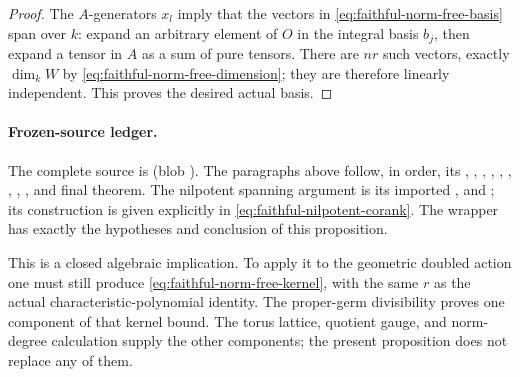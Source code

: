 \begin{proof}
The \(A\)-generators \(x_l\) imply that the vectors in
\eqref{eq:faithful-norm-free-basis} span over \(k\):
expand an arbitrary element of \(O\) in the integral basis
\(b_j\), then expand a tensor in \(A\) as a sum of pure tensors.
There are \(nr\) such vectors, exactly \(\dim_k W\) by
\eqref{eq:faithful-norm-free-dimension}; they are therefore
linearly independent.  This proves the desired actual basis.
\end{proof}

\paragraph{Frozen-source ledger.}
The complete source is
\href{https://github.com/ChristianKudeba/alpoge-rh-verification/blob/alpoge-source-7cbf7a0c/src/Development/WeilBound/CoreStatements/TorusUniformisation/ChowMahlerFamilies/KernelRankAlgebraicBound.lean}
{}
(blob ).
The paragraphs above follow, in order, its
, , ,
, ,
, , ,
, and final theorem.
The nilpotent spanning argument is its imported
\href{https://github.com/ChristianKudeba/alpoge-rh-verification/blob/alpoge-source-7cbf7a0c/src/Development/WeilBound/CoreStatements/TorusUniformisation/ChowMahlerFamilies/JordanBasisNilpotent.lean}
{},
 and ;
its construction is given explicitly in
\eqref{eq:faithful-nilpotent-corank}.
The wrapper
\href{https://github.com/ChristianKudeba/alpoge-rh-verification/blob/alpoge-source-7cbf7a0c/src/Development/AutomorphicSpectrum/Proofs/AlgebraProofs/KernelRankBoundNormValuation.lean}
{}
has exactly the hypotheses and conclusion of this proposition.

This is a closed algebraic implication.
To apply it to the geometric doubled action one must still
produce \eqref{eq:faithful-norm-free-kernel}, with the same
\(r\) as the actual characteristic-polynomial identity.
The proper-germ divisibility proves one component of that
kernel bound.  The torus lattice, quotient gauge, and
norm-degree calculation supply the other components; the
present proposition does not replace any of them.
